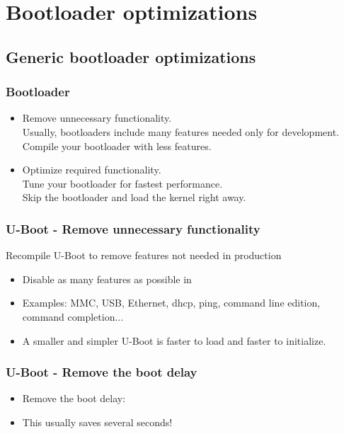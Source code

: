 \section{Bootloader optimizations}

\subsection{Generic bootloader optimizations}

\begin{frame}
\frametitle{Bootloader}
\begin{itemize}

\item Remove unnecessary functionality.\\
      Usually, bootloaders include many features needed only for
      development. Compile your bootloader with less features.
\item Optimize required functionality.\\
      Tune your bootloader for fastest performance. \\
      Skip the bootloader and load the kernel right away.
\end{itemize}
\end{frame}

\begin{frame}
\frametitle{U-Boot - Remove unnecessary functionality}
Recompile U-Boot to remove features not needed in production
\begin{itemize}
\item Disable as many features as possible
      in 
\item Examples: MMC, USB, Ethernet, dhcp, ping, command line edition,
      command completion...
\item A smaller and simpler U-Boot is faster to load and faster
      to initialize.
\end{itemize}
\end{frame}

\begin{frame}
\frametitle{U-Boot - Remove the boot delay}
\begin{itemize}
\item Remove the boot delay:\\
\item This usually saves several seconds!
\end{itemize}
\end{frame}

